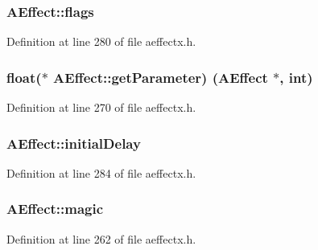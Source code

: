 \subsubsection[{\texorpdfstring{flags}{flags}}]{ A\+Effect\+::flags}\hypertarget{class_a_effect_a443cb28fecb734ad4ed7adb7edda2a36}{}\label{class_a_effect_a443cb28fecb734ad4ed7adb7edda2a36}


Definition at line 280 of file aeffectx.\+h.

\subsubsection[{\texorpdfstring{get\+Parameter}{getParameter}}]{\setlength{\rightskip}{0pt plus 5cm}float($\ast$  A\+Effect\+::get\+Parameter) ({\bf A\+Effect} $\ast$, {\bf int})}\hypertarget{class_a_effect_ab39d6235285c58b453309d3c669448ea}{}\label{class_a_effect_ab39d6235285c58b453309d3c669448ea}


Definition at line 270 of file aeffectx.\+h.

\subsubsection[{\texorpdfstring{initial\+Delay}{initialDelay}}]{ A\+Effect\+::initial\+Delay}\hypertarget{class_a_effect_a42fb0646943502b8f3a3585f05c0a29d}{}\label{class_a_effect_a42fb0646943502b8f3a3585f05c0a29d}


Definition at line 284 of file aeffectx.\+h.

\subsubsection[{\texorpdfstring{magic}{magic}}]{ A\+Effect\+::magic}\hypertarget{class_a_effect_a8befa10d161c594de86507153cc74b1e}{}\label{class_a_effect_a8befa10d161c594de86507153cc74b1e}


Definition at line 262 of file aeffectx.\+h.

